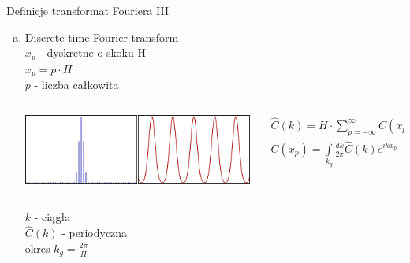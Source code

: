 \begin{frame}{Definicje transformat Fouriera III}
	\begin{enumerate}[c)]
		\item Discrete-time Fourier transform \\
		$x_p$ - dyskretne o skoku H \\
		$x_p = p \cdot H$ \\
		$p$ - liczba całkowita
        \begin{columns}
            \begin{column}{0.35\textwidth}
                \includegraphics[width=\textwidth]{img/16/dtft_wykres1.png}
            \end{column}
            \begin{column}{0.65\textwidth}
                \begin{block}
                    \centering
                    \renewcommand{\arraystretch}{1.5}
                    \setlength{\abovedisplayskip}{0pt}
                    \setlength{\belowdisplayskip}{0pt}
                    \setlength{\abovedisplayshortskip}{0pt}
                    \setlength{\belowdisplayshortskip}{0pt}
                    \[
                        \begin{array}{c}
                            \widehat{C}(k) = H \cdot \sum\limits_{p = -\infty}^{\infty} C(x_p) e^{-ikx_p} \\
                            C(x_p) = \int\limits_{k_g} \frac{dk}{2 \pi} \widehat{C}(k) e^{ikx_p}
                        \end{array}
                        \tag{16.3}
                    \]
                \end{block}
            \end{column}
        \end{columns}
		$k$ - ciągła \\
		$\widehat{C}(k)$ - periodyczna \\
		okres $k_g = \frac{2 \pi}{H}$
	\end{enumerate}
\end{frame}
